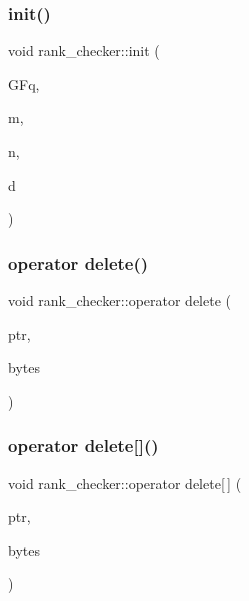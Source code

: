 \mbox{\label{classrank__checker_a0fa39180d8de36ca46fd2cacdad914e2}} 
\subsubsection{\texorpdfstring{init()}{init()}}
{\footnotesize\ttfamily void rank\+\_\+checker\+::init (\begin{DoxyParamCaption}\item[{\mbox{\hyperlink{classfinite__field}{finite\+\_\+field}} $\ast$}]{G\+Fq,  }\item[{\mbox{\hyperlink{galois_8h_a09fddde158a3a20bd2dcadb609de11dc}{I\+NT}}}]{m,  }\item[{\mbox{\hyperlink{galois_8h_a09fddde158a3a20bd2dcadb609de11dc}{I\+NT}}}]{n,  }\item[{\mbox{\hyperlink{galois_8h_a09fddde158a3a20bd2dcadb609de11dc}{I\+NT}}}]{d }\end{DoxyParamCaption})}

\mbox{\label{classrank__checker_aec5863002e43a21f998ecd0694174ebf}} 
\subsubsection{\texorpdfstring{operator delete()}{operator delete()}}
{\footnotesize\ttfamily void rank\+\_\+checker\+::operator delete (\begin{DoxyParamCaption}\item[{void $\ast$}]{ptr,  }\item[{size\+\_\+t}]{bytes }\end{DoxyParamCaption})}

\mbox{\label{classrank__checker_a014143cb4f95e2be4160ad9ff2a0a0d5}} 
\subsubsection{\texorpdfstring{operator delete[]()}{operator delete[]()}}
{\footnotesize\ttfamily void rank\+\_\+checker\+::operator delete\mbox{[}$\,$\mbox{]} (\begin{DoxyParamCaption}\item[{void $\ast$}]{ptr,  }\item[{size\+\_\+t}]{bytes }\end{DoxyParamCaption})}

